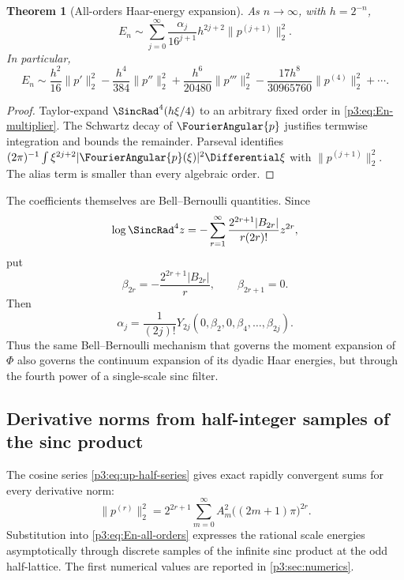 \documentclass[11pt]{article}
\newtheorem{theorem}{Theorem}[section]
\theoremstyle{definition}
\theoremstyle{remark}
\begin{document}
\begin{theorem}[All-orders Haar-energy expansion]
\label{p3:thm:Haar-energy-all-orders}
As $n\to\infty$, with $h=2^{-n}$,
\begin{equation}\label{p3:eq:En-all-orders}
 E_n\sim\sum_{j=0}^\infty
 \frac{\alpha_j}{16^{j+1}}h^{2j+2}
 \|p^{(j+1)}\|_2^2.
\end{equation}
In particular,
\begin{equation}\label{p3:eq:En-first-terms}
 E_n\sim
 \frac{h^2}{16}\|p'\|_2^2
 -\frac{h^4}{384}\|p''\|_2^2
 +\frac{h^6}{20480}\|p'''\|_2^2
 -\frac{17h^8}{30965760}\|p^{(4)}\|_2^2+\cdots.
\end{equation}
\end{theorem}

\begin{proof}
Taylor-expand $\SincRad^4(h\xi/4)$ to an arbitrary fixed order in
\eqref{p3:eq:En-multiplier}.  The Schwartz decay of $\FourierAngular{p}$ justifies
termwise integration and bounds the remainder.  Parseval identifies
$(2\pi)^{-1}\int\xi^{2j+2}|\FourierAngular{p}(\xi)|^2\Differential\xi$ with
$\|p^{(j+1)}\|_2^2$.  The alias term is smaller than every algebraic order.
\end{proof}

The coefficients themselves are Bell--Bernoulli quantities.  Since
\begin{equation}\label{p3:eq:log-sinc4}
 \log\SincRad^4z
 =-\sum_{r=1}^\infty
 \frac{2^{2r+1}|B_{2r}|}{r(2r)!}z^{2r},
\end{equation}
put
\begin{equation}\label{p3:eq:beta-sinc4}
 \beta_{2r}=-\frac{2^{2r+1}|B_{2r}|}{r},
 \qquad \beta_{2r+1}=0.
\end{equation}
Then
\begin{equation}\label{p3:eq:alpha-Bell}
 \alpha_j=\frac1{(2j)!}
 Y_{2j}(0,\beta_2,0,\beta_4,\ldots,\beta_{2j}).
\end{equation}
Thus the same Bell--Bernoulli mechanism that governs the moment expansion of
$\Phi$ also governs the continuum expansion of its dyadic Haar energies, but
through the fourth power of a single-scale sinc filter.

\subsection{Derivative norms from half-integer samples of the sinc product}

The cosine series \eqref{p3:eq:up-half-series} gives exact rapidly convergent sums
for every derivative norm:
\begin{equation}\label{p3:eq:p-derivative-norm-samples}
 \|p^{(r)}\|_2^2
 =2^{2r+1}\sum_{m=0}^\infty
 A_m^2\bigl((2m+1)\pi\bigr)^{2r}.
\end{equation}
Substitution into \eqref{p3:eq:En-all-orders} expresses the rational scale energies
asymptotically through discrete samples of the infinite sinc product at the odd
half-lattice.  The first numerical values are reported in
\cref{p3:sec:numerics}.
\end{document}
